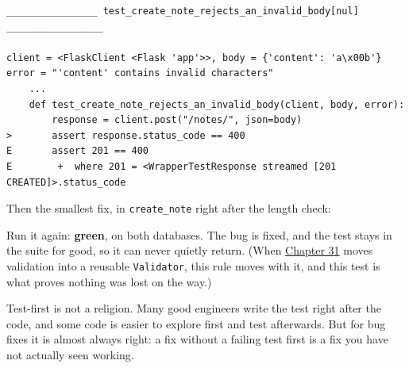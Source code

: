 \begin{outputbox}[short]
\begin{Verbatim}[fontsize=\codesize, breaklines, breakanywhere, breaksymbolleft={\tiny\textcolor{muted}{$\hookrightarrow$}}]
________________ test_create_note_rejects_an_invalid_body[nul] _________________

client = <FlaskClient <Flask 'app'>>, body = {'content': 'a\x00b'}
error = "'content' contains invalid characters"
    ...
    def test_create_note_rejects_an_invalid_body(client, body, error):
        response = client.post("/notes/", json=body)
>       assert response.status_code == 400
E       assert 201 == 400
E        +  where 201 = <WrapperTestResponse streamed [201 CREATED]>.status_code
\end{Verbatim}
\end{outputbox}

\noindent{}Then the smallest fix, in \texttt{create\_note} right after the length check:

\begin{codebox}[short]

\begin{Shaded}
\begin{Highlighting}[]
      
        \NormalTok{)}
\end{Highlighting}
\end{Shaded}

\end{codebox}

\noindent{}Run it again: \textbf{green}, on both databases. The bug is fixed, and the test stays in the suite for good, so it can never quietly return. (When \hyperref[ch:31-input-handling]{Chapter 31} moves validation into a reusable \texttt{Validator}, this rule moves with it, and this test is what proves nothing was lost on the way.)

Test-first is not a religion. Many good engineers write the test right after the code, and some code is easier to explore first and test afterwards. But for bug fixes it is almost always right: a fix without a failing test first is a fix you have not actually seen working.

